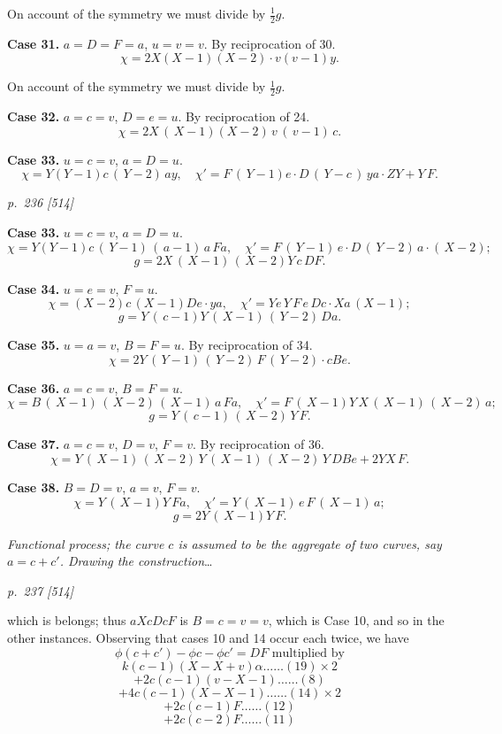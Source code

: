 \documentclass[11pt,a4paper]{book}
\begin{document}
On account of the symmetry we must divide by $\frac{1}{2}g$.

\textbf{Case 31.}  $a=D=F=a$, $u=v=v$.  By reciprocation of 30.
\[
\chi=2X(X-1)(X-2)\cdot v(v-1)y.
\]

On account of the symmetry we must divide by $\frac{1}{2}g$.

\textbf{Case 32.}  $a=c=v$, $D=e=u$.  By reciprocation of 24.
\[
\chi=2X\,(\,X-1)(X-2)\,v\,(\,v-1)\,c.
\]

\textbf{Case 33.}  $u=c=v$, $a=D=u$.
\[
\chi=Y(Y-1)c\,(\,Y-2)\,ay, \quad \chi'=F\,(\,Y-1)e\cdot D\,(\,Y-c\,)\,ya\cdot ZY+Y\,F.
\]

\bigskip
\textit{p.~236 [514]}
\smallskip

\textbf{Case 33.}  $u=c=v$, $a=D=u$.
\[
\chi=Y(Y-1)c\,(\,Y-1)\,(\,a-1)\,a\,Fa, \quad \chi'=F\,(\,Y-1)\,e\cdot D\,(\,Y-2)\,a\cdot (\,X-2);
\]
\[
g=2X\,(\,X-1)\,(\,X-2)Y\,c\,DF.
\]

\textbf{Case 34.}  $u=e=v$, $F=u$.
\[
\chi=(X-2)c\,(X-1)De\cdot ya, \quad \chi'=Ye\,Y\,F\,e\,Dc\cdot Xa\,(X-1);
\]
\[
g=Y\,(\,c-1)Y\,(\,X-1)\,(\,Y-2)\,Da.
\]

\textbf{Case 35.}  $u=a=v$, $B=F=u$.  By reciprocation of 34.
\[
\chi=2Y\,(\,Y-1)\,(\,Y-2)\,F\,(\,Y-2)\cdot cBe.
\]

\textbf{Case 36.}  $a=c=v$, $B=F=u$.
\[
\chi=B\,(\,X-1)\,(\,X-2)\,(\,X-1)\,a\,Fa, \quad \chi'=F\,(\,X-1)Y\,X\,(\,X-1)\,(\,X-2)\,a;
\]
\[
g=Y\,(\,c-1)\,(\,X-2)\,Y\,F.
\]

\textbf{Case 37.}  $a=c=v$, $D=v$, $F=v$.  By reciprocation of 36.
\[
\chi=Y\,(\,X-1)\,(\,X-2)\,Y\,(\,X-1)\,(\,X-2)\,Y\,DBe+2YX\,F.
\]

\textbf{Case 38.}  $B=D=v$, $a=v$, $F=v$.
\[
\chi=Y\,(\,X-1)Y\,Fa, \quad \chi'=Y\,(\,X-1)\,e\,F\,(\,X-1)\,a;
\]
\[
g=2Y\,(\,X-1)Y\,F.
\]

\textit{Functional process; the curve $c$ is assumed to be the aggregate of two curves, say
$a=c+c'$.  Drawing the construction}\dots

\clearpage

\bigskip
\textit{p.~237 [514]}
\smallskip

which is belongs; thus $aXcDcF$ is $B=c=v=v$, which is Case 10, and so in the
other instances.  Observing that cases 10 and 14 occur each twice, we have
\[
\phi(c+c')-\phi c-\phi c'=DF \text{ multiplied by}
\]
\[
k(c-1)(X-X+v)\alpha\ldots\ldots(19)\times 2
\]
\[
+2c(c-1)(v-X-1)\ldots\ldots(8)
\]
\[
+4c(c-1)(X-X-1)\ldots\ldots(14)\times 2
\]
\[
+2c(c-1)F\ldots\ldots(12)
\]
\[
+2c(c-2)F\ldots\ldots(11)
\]
\end{document}

